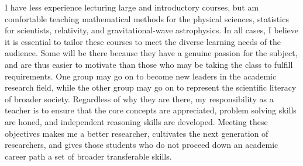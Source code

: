 \documentclass[11pt,letterpaper,sans]{moderncv} %
\begin{document}
I have less experience lecturing large and introductory courses, but am comfortable teaching mathematical methods for the physical sciences, statistics for scientists, relativity, and gravitational-wave astrophysics. In all cases, I believe it is essential to tailor these courses to meet the diverse learning needs of the audience. Some will be there because they have a genuine passion for the subject, and are thus easier to motivate than those who may be taking the class to fulfill requirements. One group may go on to become new leaders in the academic research field, while the other group may go on to represent the scientific literacy of broader society. Regardless of why they are there, my responsibility as a teacher is to ensure that the core concepts are appreciated, problem solving skills are honed, and independent reasoning skills are developed. Meeting these objectives makes me a better researcher, cultivates the next generation of researchers, and gives those students who do not proceed down an academic career path a set of broader transferable skills.
\end{document}
